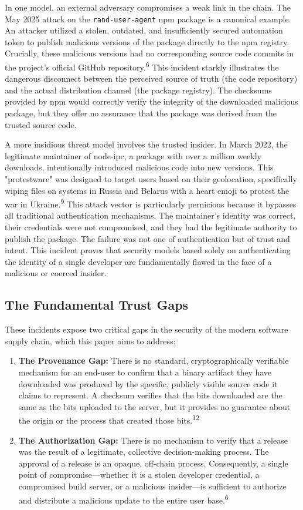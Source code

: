 \documentclass{article}
\begin{document}
In one model, an external adversary compromises a weak link in the chain. The May 2025 attack on the \lstinline{rand-user-agent} npm package is a canonical example. An attacker utilized a stolen, outdated, and insufficiently secured automation token to publish malicious versions of the package directly to the npm registry. Crucially, these malicious versions had no corresponding source code commits in the project's official GitHub repository.\textsuperscript{6} This incident starkly illustrates the dangerous disconnect between the perceived source of truth (the code repository) and the actual distribution channel (the package registry). The checksums provided by npm would correctly verify the integrity of the downloaded malicious package, but they offer no assurance that the package was derived from the trusted source code.

A more insidious threat model involves the trusted insider. In March 2022, the legitimate maintainer of node-ipc, a package with over a million weekly downloads, intentionally introduced malicious code into new versions. This "protestware" was designed to target users based on their geolocation, specifically wiping files on systems in Russia and Belarus with a heart emoji to protest the war in Ukraine.\textsuperscript{9} This attack vector is particularly pernicious because it bypasses all traditional authentication mechanisms. The maintainer's identity was correct, their credentials were not compromised, and they had the legitimate authority to publish the package. The failure was not one of authentication but of trust and intent. This incident proves that security models based solely on authenticating the identity of a single developer are fundamentally flawed in the face of a malicious or coerced insider.

\subsection{The Fundamental Trust Gaps}

These incidents expose two critical gaps in the security of the modern software supply chain, which this paper aims to address:

\begin{enumerate}
\item \textbf{The Provenance Gap:} There is no standard, cryptographically verifiable mechanism for an end-user to confirm that a binary artifact they have downloaded was produced by the specific, publicly visible source code it claims to represent. A checksum verifies that the bits downloaded are the same as the bits uploaded to the server, but it provides no guarantee about the origin or the process that created those bits.\textsuperscript{12}
\item \textbf{The Authorization Gap:} There is no mechanism to verify that a release was the result of a legitimate, collective decision-making process. The approval of a release is an opaque, off-chain process. Consequently, a single point of compromise---whether it is a stolen developer credential, a compromised build server, or a malicious insider---is sufficient to authorize and distribute a malicious update to the entire user base.\textsuperscript{6}
\end{enumerate}
\end{document}
